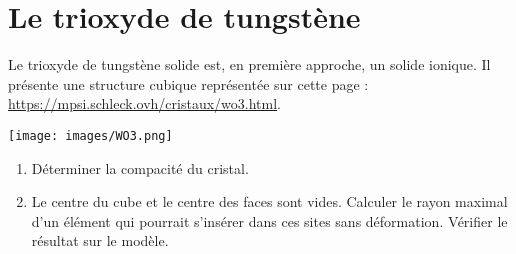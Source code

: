 \documentclass[]{tp}
\begin{document}
\section{Le trioxyde de tungstène}
Le trioxyde de tungstène  solide est, en première approche, un solide ionique. Il présente une structure cubique représentée sur cette page : \url{https://mpsi.schleck.ovh/cristaux/wo3.html}.
\begin{center}
  \texttt{[image: images/WO3.png]}
\end{center}
\begin{enumerate}
  \item Déterminer la compacité du cristal.
  \item Le centre du cube et le centre des faces sont vides. Calculer le rayon maximal d'un élément qui pourrait s'insérer dans ces sites sans déformation. Vérifier le résultat sur le modèle.
\end{enumerate}
\end{document}

